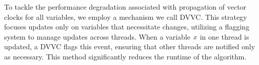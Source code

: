 \documentclass[nonacm,sigplan]{acmart}
\begin{document}
To tackle the performance degradation associated with propagation of vector clocks for all variables, we employ a mechanism we call DVVC. This strategy focuses updates only on variables that necessitate changes, utilizing a flagging system to manage updates across threads. When a variable $x$ in one thread is updated, a DVVC flags this event, ensuring that other threads are notified only as necessary. This method significantly reduces the runtime of the algorithm.


\begin{algorithm}
    \caption{\NameRaceDetector - Optimized}
    \label{alg:cprdopt}
\end{algorithm}
\end{document}
